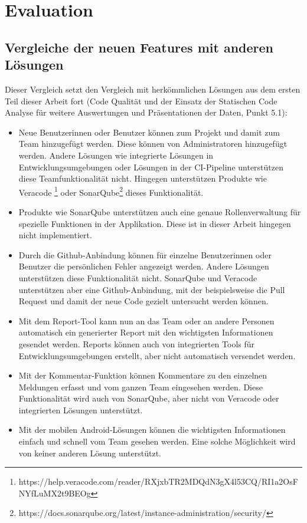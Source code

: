 \chapter{Evaluation}
\label{Evaluierung}
\chapterstart
\section{Vergleiche der neuen Features mit anderen Lösungen}
Dieser Vergleich setzt den Vergleich mit herkömmlichen Lösungen aus dem ersten Teil dieser Arbeit fort (Code Qualität und der Einsatz der Statischen Code Analyse für weitere Auswertungen und Präsentationen der Daten, Punkt 5.1):

\begin{itemize} 
\item Neue Benutzerinnen oder Benutzer können zum Projekt und damit zum Team hinzugefügt werden. Diese können von Administratoren hinzugefügt werden. Andere Lösungen wie integrierte Lösungen in Entwicklungsumgebungen oder Lösungen in der CI-Pipeline unterstützen diese Teamfunktionalität nicht. Hingegen unterstützen Produkte wie Veracode \footnote{https://help.veracode.com/reader/RXjxbTR2MDQdN3gX4l53CQ/RI1a2OsFNYfLuMX2t9BEOg} oder SonarQube\footnote{https://docs.sonarqube.org/latest/instance-administration/security/} dieses Funktionalität.
\item Produkte wie SonarQube unterstützen auch eine genaue Rollenverwaltung für spezielle Funktionen in der Applikation. Diese ist in dieser Arbeit hingegen nicht implementiert.
\item Durch die Github-Anbindung können für einzelne Benutzerinnen oder Benutzer die persönlichen Fehler angezeigt werden. Andere Lösungen unterstützen diese Funktionalität nicht. SonarQube und Veracode unterstützen aber eine Github-Anbindung, mit der beispielsweise die Pull Request und damit der neue Code gezielt untersucht werden können.
\item Mit dem Report-Tool kann nun an das Team oder an andere Personen automatisch ein generierter Report mit den wichtigsten Informationen gesendet werden. Reports können auch von integrierten Tools für Entwicklungsumgebungen erstellt, aber nicht automatisch versendet werden.
\item Mit der Kommentar-Funktion können Kommentare zu den einzelnen Meldungen erfasst und vom ganzen Team eingesehen werden. Diese Funktionalität wird auch von SonarQube, aber nicht von Veracode oder integrierten Lösungen unterstützt.
\item Mit der mobilen Android-Lösungen können die wichtigsten Informationen einfach und schnell vom Team gesehen werden. Eine solche Möglichkeit wird von keiner anderen Lösung unterstützt.
\end{itemize}

